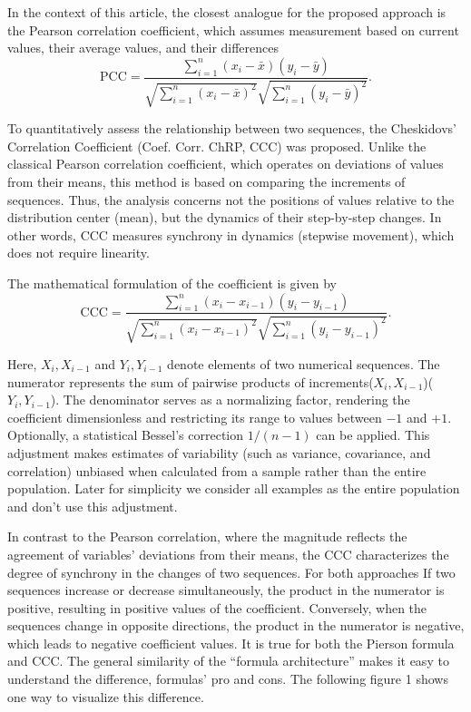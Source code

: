 \documentclass[aos]{imsart}
\begin{document}
In the context of this article, the closest analogue for the proposed approach is the Pearson correlation coefficient, which assumes measurement based on current values, their average values, and their differences
\begin{equation}
\text{PCC} = \frac{\sum_{i=1}^n (x_i - \bar{x})(y_i - \bar{y})}{\sqrt{\sum_{i=1}^n (x_i - \bar{x})^2}\sqrt{\sum_{i=1}^n (y_i - \bar{y})^2}}.
\end{equation}

To quantitatively assess the relationship between two sequences, the Cheskidovs' Correlation Coefficient (Coef. Corr. ChRP, CCC) was proposed. Unlike the classical Pearson correlation coefficient, which operates on deviations of values from their means, this method is based on comparing the increments of sequences. Thus, the analysis concerns not the positions of values relative to the distribution center (mean), but the dynamics of their step-by-step changes. In other words, CCC measures synchrony in dynamics (stepwise movement), which does not require linearity.

The mathematical formulation of the coefficient is given by
\begin{equation}
\text{CCC} = \frac{\sum_{i=1}^n (x_i - x_{i-1})(y_i - y_{i-1})}{\sqrt{\sum_{i=1}^n (x_i - x_{i-1})^2} \sqrt{\sum_{i=1}^n (y_i - y_{i-1})^2}}.
\end{equation}

Here, $X_i, X_{i-1}$ and $Y_i, Y_{i-1}$ denote elements of two numerical sequences. The numerator represents the sum of pairwise products of increments($X_i, X_{i-1}$)($Y_i, Y_{i-1}$).  The denominator serves as a normalizing factor, rendering the coefficient dimensionless and restricting its range to values between $-1$ and $+1$. Optionally, a statistical Bessel’s correction $1/(n-1)$ can be applied. This adjustment makes estimates of variability (such as variance, covariance, and correlation) unbiased when calculated from a sample rather than the entire population. Later for simplicity we consider all examples as the entire population and don’t use this adjustment.

In contrast to the Pearson correlation, where the magnitude reflects the agreement of variables’ deviations from their means, the CCC characterizes the degree of synchrony in the changes of two sequences. For both approaches If two sequences increase or decrease simultaneously, the product in the numerator is positive, resulting in positive values of the coefficient. Conversely, when the sequences change in opposite directions, the product in the numerator is negative, which leads to negative coefficient values. It is true for both the Pierson formula and CCC. The general similarity of the “formula architecture” makes it easy to understand the difference, formulas’ pro and cons. The following figure 1 shows one way to visualize this difference.
\end{document}
